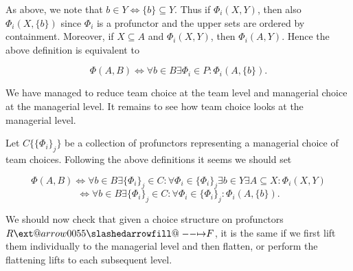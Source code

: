 \documentclass[12pt]{article}
\makeatletter
\theoremstyle{definition}
\theoremstyle{plain}
\theoremstyle{plain}
\theoremstyle{plain}
\theoremstyle{plain}
\theoremstyle{remark}
\theoremstyle{remark}
\newcommand{\sub}{\subseteq}
\def\slashedarrowfill@#1#2#3#4#5{%
	$\m@th\thickmuskip0mu\medmuskip\thickmuskip\thinmuskip\thickmuskip
	\relax#5#1\mkern-7mu%
	\cleaders\hbox{$#5\mkern-2mu#2\mkern-2mu$}\hfill
	\mathclap{#3}\mathclap{#2}%
	\cleaders\hbox{$#5\mkern-2mu#2\mkern-2mu$}\hfill
	\mkern-7mu#4$%
}
\def\rightslashedarrowfill@{%
	\slashedarrowfill@\relbar\relbar\mapstochar\rightarrow}
\newcommand\xslashedrightarrow[2][]{%
	\ext@arrow 0055{\rightslashedarrowfill@}{#1}{#2}}
\makeatother
\begin{document}
As above, we note that $b \in Y \iff \{b\} \sub Y$. Thus if $\Phi_i(X,Y)$, then also $\Phi_i(X,\{b\})$ since $\Phi_i$ is a profunctor and the upper sets are ordered by containment. Moreover, if $X \sub A$ and $\Phi_i(X,Y)$, then $\Phi_i(A,Y)$. Hence the above definition is equivalent to 

$$ \Phi(A,B) \iff \forall b \in B \exists \Phi_i \in P : \Phi_i(A,\{b\}).$$

We have managed to reduce team choice at the team level and managerial choice at the managerial level. It remains to see how team choice looks at the managerial level.

Let $C \{\{\Phi_i\}_j\}$ be a collection of profunctors representing a managerial choice of team choices. Following the above definitions it seems we should set

$$ \Phi(A,B) \iff \forall b \in B \exists \{\Phi_i\}_j \in C : \forall \Phi_i \in \{\Phi_i\}_j \exists b \in  Y \exists A \sub X : \Phi_i(X,Y)$$
$$ \iff \forall b \in B \exists \{\Phi_i\}_j \in C : \forall \Phi_i \in \{\Phi_i\}_j : \Phi_i(A,\{b\}).$$ 

We should now check that given a choice structure on profunctors $R  \xslashedrightarrow{} F$, it is the same if we first lift them individually to the managerial level and then flatten, or perform the flattening lifts to each subsequent level.

\newpage
\printbibliography
\end{document}
